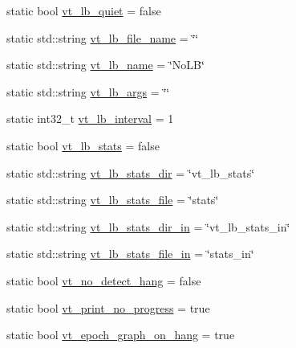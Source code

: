 \begin{DoxyCompactItemize}
\item 
static bool \hyperlink{structvt_1_1arguments_1_1_arg_config_ab0a9812811750643510b00fb7c0651a5}{vt\+\_\+lb\+\_\+quiet} = false
\item 
static std\+::string \hyperlink{structvt_1_1arguments_1_1_arg_config_adadeb5ba97bec396d11b5c856736bd3e}{vt\+\_\+lb\+\_\+file\+\_\+name} = \char`\"{}\char`\"{}
\item 
static std\+::string \hyperlink{structvt_1_1arguments_1_1_arg_config_a856cdf90d67403a08574e5a7a3ca792c}{vt\+\_\+lb\+\_\+name} = \char`\"{}No\+LB\char`\"{}
\item 
static std\+::string \hyperlink{structvt_1_1arguments_1_1_arg_config_aa9c190d04d0c6f9b3dac4ac56ac1a721}{vt\+\_\+lb\+\_\+args} = \char`\"{}\char`\"{}
\item 
static int32\+\_\+t \hyperlink{structvt_1_1arguments_1_1_arg_config_a273268a11a1525ad3754c72f5e6494b3}{vt\+\_\+lb\+\_\+interval} = 1
\item 
static bool \hyperlink{structvt_1_1arguments_1_1_arg_config_adf22250e9e2d60c5c57f41b8050f4697}{vt\+\_\+lb\+\_\+stats} = false
\item 
static std\+::string \hyperlink{structvt_1_1arguments_1_1_arg_config_a279d3953c475ea80bac06e2ed5ba6b5f}{vt\+\_\+lb\+\_\+stats\+\_\+dir} = \char`\"{}vt\+\_\+lb\+\_\+stats\char`\"{}
\item 
static std\+::string \hyperlink{structvt_1_1arguments_1_1_arg_config_ad6c76c8ec1dd43338a10f35929ce53f7}{vt\+\_\+lb\+\_\+stats\+\_\+file} = \char`\"{}stats\char`\"{}
\item 
static std\+::string \hyperlink{structvt_1_1arguments_1_1_arg_config_a2db08bf2d315dad981aaa9f5f79d31a5}{vt\+\_\+lb\+\_\+stats\+\_\+dir\+\_\+in} = \char`\"{}vt\+\_\+lb\+\_\+stats\+\_\+in\char`\"{}
\item 
static std\+::string \hyperlink{structvt_1_1arguments_1_1_arg_config_a7b294f12d448dcfe20f418db26a509bf}{vt\+\_\+lb\+\_\+stats\+\_\+file\+\_\+in} = \char`\"{}stats\+\_\+in\char`\"{}
\item 
static bool \hyperlink{structvt_1_1arguments_1_1_arg_config_a567d431e527d7a77c2bbddb4c52b781e}{vt\+\_\+no\+\_\+detect\+\_\+hang} = false
\item 
static bool \hyperlink{structvt_1_1arguments_1_1_arg_config_a6bbdd118f6e731cd446afb5e33af11bf}{vt\+\_\+print\+\_\+no\+\_\+progress} = true
\item 
static bool \hyperlink{structvt_1_1arguments_1_1_arg_config_ac691ea78d2c3079f3600f053f4fffa11}{vt\+\_\+epoch\+\_\+graph\+\_\+on\+\_\+hang} = true

\end{DoxyCompactItemize}
